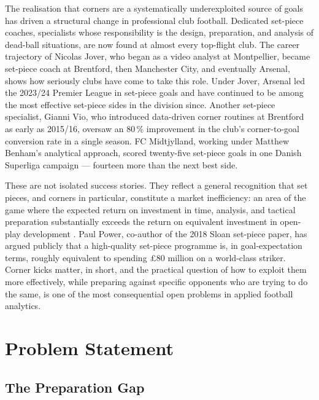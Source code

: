 The realisation that corners are a systematically underexploited source of goals
has driven a structural change in professional club football. Dedicated
set-piece coaches, specialists whose responsibility is the design,
preparation, and analysis of dead-ball situations, are now found at almost
every top-flight club. The career trajectory of Nicolas Jover, who began as a
video analyst at Montpellier, became set-piece coach at Brentford, then
Manchester City, and eventually Arsenal, shows how seriously clubs have come to
take this role. Under Jover, Arsenal led the 2023/24 Premier League in set-piece
goals and have continued to be among the most effective set-piece sides in the
division since.%
Another set-piece specialist, Gianni Vio, who introduced data-driven corner
routines at Brentford as early as 2015/16, oversaw an 80\,\% improvement in the
club's corner-to-goal conversion rate in a single season. FC Midtjylland,
working under Matthew Benham's analytical approach, scored twenty-five
set-piece goals in one Danish Superliga campaign --- fourteen more than the next
best side.

These are not isolated success stories. They reflect a general recognition that
set pieces, and corners in particular, constitute a market inefficiency:
an area of the game where the expected return on investment in time, analysis,
and tactical preparation substantially exceeds the return on equivalent
investment in open-play development \citep{Power2018}. Paul Power, co-author of
the 2018 Sloan set-piece paper, has argued publicly that a high-quality set-piece
programme is, in goal-expectation terms, roughly equivalent to spending
\pounds80 million on a world-class striker. Corner kicks matter, in short,
and the practical question of how to exploit them more effectively, while
preparing against specific opponents who are trying to do the same, is one of
the most consequential open problems in applied football analytics.

\chapter{Problem Statement}
\label{sec:problem_statement}

\section{The Preparation Gap}
\label{sec:prob_preparation}

